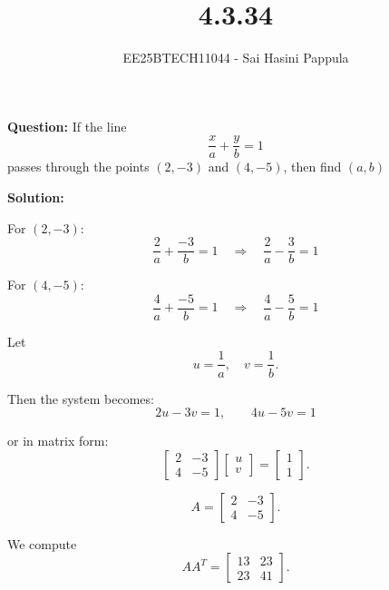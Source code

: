 \documentclass[journal]{IEEEtran}
\begin{document}

\vspace{3cm}

\title{4.3.34}
\author{EE25BTECH11044 - Sai Hasini Pappula}
 \maketitle
{\let\newpage\relax\maketitle}

\renewcommand{\thefigure}{\theenumi}
\renewcommand{\thetable}{\theenumi}
\setlength{\intextsep}{10pt} %


\renewcommand{\thetable}{\theenumi}
\textbf{Question:}  
If the line 
\[
\frac{x}{a} + \frac{y}{b} = 1
\]
passes through the points $(2,-3)$ and $(4,-5)$, then find $(a,b)$ 

\textbf{Solution:}  

For $(2,-3)$:
\[
\frac{2}{a} + \frac{-3}{b} = 1 \quad \Rightarrow \quad \frac{2}{a} - \frac{3}{b} = 1
\]

For $(4,-5)$:
\[
\frac{4}{a} + \frac{-5}{b} = 1 \quad \Rightarrow \quad \frac{4}{a} - \frac{5}{b} = 1
\]

Let 
\[
u = \frac{1}{a}, \quad v = \frac{1}{b}.
\]

Then the system becomes:
\[
2u - 3v = 1, \qquad 4u - 5v = 1
\]

or in matrix form:
\[
\begin{bmatrix}
2 & -3 \\
4 & -5
\end{bmatrix}
\begin{bmatrix}
u \\ v
\end{bmatrix}
=
\begin{bmatrix}
1 \\ 1
\end{bmatrix}.
\]


\[
A = \begin{bmatrix} 2 & -3 \\ 4 & -5 \end{bmatrix}.
\]

We compute
\[
A A^T =
\begin{bmatrix}
13 & 23 \\
23 & 41
\end{bmatrix}.
\]
\end{document}
